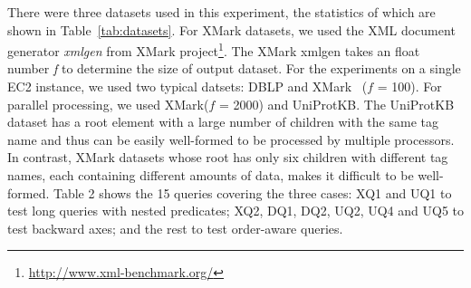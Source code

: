 There were three datasets used in this experiment, the statistics of which are
shown in Table~\ref{tab:datasets}. For XMark datasets, we used the XML document
generator \emph{xmlgen} from XMark
project\footnote{\url{http://www.xml-benchmark.org/}}. The XMark xmlgen takes an
float number \emph{f} to determine the size of output dataset. 
For the experiments on a single EC2 instance, we used two typical datsets: DBLP
and XMark~\cite{XMark} ($f$ = 100). For parallel processing, we used
XMark($f$ = 2000) and UniProtKB. The UniProtKB dataset has a root element
with a large number of children with the same tag name and thus can be easily
well-formed  to be processed by multiple processors.  In contrast, XMark
datasets whose root has only six children  with different tag names, each
containing different amounts of data, makes it difficult to be well-formed.
Table 2 shows the 15 queries covering the three cases: XQ1 and UQ1 to test long
queries with nested predicates;  XQ2, DQ1, DQ2, UQ2, UQ4 and UQ5 to test
backward axes;  and the rest to test order-aware queries.

